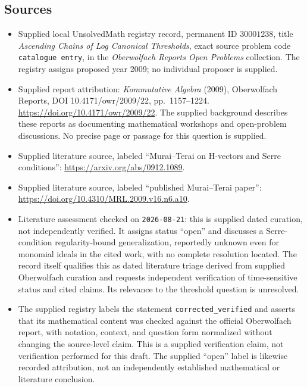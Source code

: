 \documentclass[11pt]{article}
\begin{document}
\subsection{Sources}
\begin{itemize}
\item Supplied local UnsolvedMath registry record, permanent ID \(30001238\), title \emph{Ascending Chains of Log Canonical Thresholds}, exact source problem code \texttt{catalogue entry}, in the \emph{Oberwolfach Reports Open Problems} collection. The registry assigns proposed year 2009; no individual proposer is supplied.
\item Supplied report attribution: \emph{Kommutative Algebra} (2009), Oberwolfach Reports, DOI 10.4171/owr/2009/22, pp.~1157--1224. \url{https://doi.org/10.4171/owr/2009/22}. The supplied background describes these reports as documenting mathematical workshops and open-problem discussions. No precise page or passage for this question is supplied.
\item Supplied literature source, labeled ``Murai--Terai on H-vectors and Serre conditions'': \url{https://arxiv.org/abs/0912.1089}.
\item Supplied literature source, labeled ``published Murai--Terai paper'': \url{https://doi.org/10.4310/MRL.2009.v16.n6.a10}.
\item Literature assessment checked on \texttt{2026-08-21}: this is supplied dated curation, not independently verified. It assigns status ``open'' and discusses a Serre-condition regularity-bound generalization, reportedly unknown even for monomial ideals in the cited work, with no complete resolution located. The record itself qualifies this as dated literature triage derived from supplied Oberwolfach curation and requests independent verification of time-sensitive status and cited claims. Its relevance to the threshold question is unresolved.
\item The supplied registry labels the statement \texttt{corrected\_verified} and asserts that its mathematical content was checked against the official Oberwolfach report, with notation, context, and question form normalized without changing the source-level claim. This is a supplied verification claim, not verification performed for this draft. The supplied ``open'' label is likewise recorded attribution, not an independently established mathematical or literature conclusion.
\end{itemize}
\end{document}
